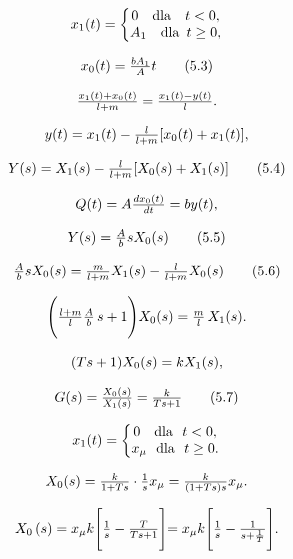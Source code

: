 \documentclass{article}
\begin{document}
\[
$$
x_{1} ( t )=\left\{\begin{matrix} {0 \quad\mathrm{d l a} \quad t < 0,} \\ {A_{1} \quad\mathrm{d l a} \enskip t \geq0,} \\ \end{matrix} \right.
$$
\]

\[
$$
x_{0} ( t )=\frac{b A_{1}} {A} t \tag{5.3}
$$
\]

\[
$$
\frac{x_{1} ( t )+x_{0} ( t )} {l+m}=\frac{x_{1} ( t )-y ( t )} {l}.
$$
\]

\[
$$
y ( t )=x_{1} ( t )-\frac{l} {l+m} [ x_{0} ( t )+x_{1} ( t ) ],
$$
\]

\[
$$
Y ( s )=X_{1} ( s )-\frac{l} {l+m} [ X_{0} ( s )+X_{1} ( s ) ] \tag{5.4}
$$
\]

\[
$$
Q ( t )=A \frac{d x_{0} ( t )} {d t}=b y ( t ),
$$
\]

\[
$$
Y ( s )=\frac{A} {b} s X_{0} ( s ) \tag{5.5}
$$
\]

\[
$$
{\frac{A} {b}} s X_{0} ( s )={\frac{m} {l+m}} X_{1} ( s )-{\frac{l} {l+m}} X_{0} ( s ) \tag{5.6}
$$
\]

\[
$$
\Biggl( \frac{l+m} {l} \frac{A} {b} \, s+1 \Biggr) X_{0} ( s )=\frac{m} {l} \, X_{1} ( s ).
$$
\]

\[
$$
( T s+1 ) X_{0} ( s )=k X_{1} ( s ),
$$
\]

\[
$$
G ( s )=\frac{X_{0} ( s )} {X_{1} ( s )}=\frac{k} {T s+1} \tag{5.7}
$$
\]

\[
$$
x_{1} ( t )=\left\{\begin{matrix} {0 \quad\mathrm{d l a} \ \ t < 0,} \\ {x_{\mu} \ \ \mathrm{d l a} \ \ t \geq0.} \\ \end{matrix} \right.
$$
\]

\[
$$
X_{0} ( s )=\frac{k} {1+T s} \cdot\frac{1} {s} x_{\mu}=\frac{k} {( 1+T s ) s} x_{\mu}.
$$
\]

\[
$$
X_{0} \left( s \right)=x_{\mu} k \Biggl[ \frac{1} {s}-\frac{T} {T s+1} \Biggl]=x_{\mu} k \Biggl[ \frac{1} {s}-\frac{1} {s+\frac{1} {T}} \Biggr].
$$
\]
\end{document}
